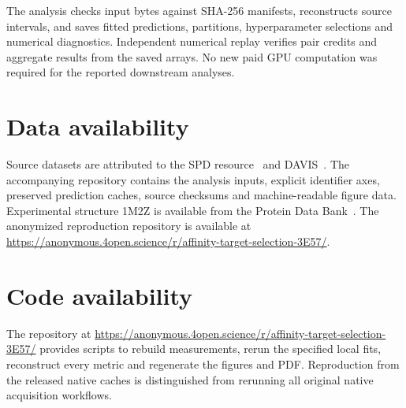 \documentclass[pdflatex, sn-nature]{sn-jnl}
\begin{document}
The analysis checks input bytes against SHA-256 manifests, reconstructs source intervals, and saves fitted predictions, partitions, hyperparameter selections and numerical diagnostics. Independent numerical replay verifies pair credits and aggregate results from the saved arrays. No new paid GPU computation was required for the reported downstream analyses.

\section*{Data availability}
Source datasets are attributed to the SPD resource~\cite{sutherland2023spd} and DAVIS~\cite{davis2011selectivity,wu2025daviscomplete}. The accompanying repository contains the analysis inputs, explicit identifier axes, preserved prediction caches, source checksums and machine-readable figure data. Experimental structure 1M2Z is available from the Protein Data Bank~\cite{pdb1m2z}. The anonymized reproduction repository is available at \url{https://anonymous.4open.science/r/affinity-target-selection-3E57/}.

\section*{Code availability}
The repository at \url{https://anonymous.4open.science/r/affinity-target-selection-3E57/} provides scripts to rebuild measurements, rerun the specified local fits, reconstruct every metric and regenerate the figures and PDF. Reproduction from the released native caches is distinguished from rerunning all original native acquisition workflows.


\end{document}
